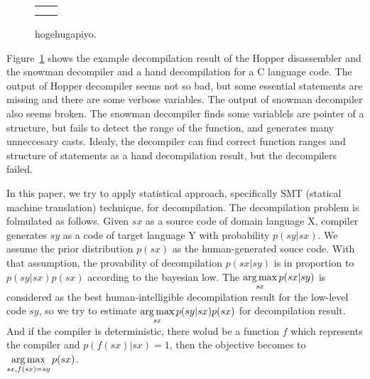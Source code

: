 \documentclass[senior,final,11pt]{iscs-thesis}
\newcommand{\argmax}{\mathop{\rm arg\,max}\limits}
\begin{document}
\begin{figure}
	\begin{tabular}{cc}
		\begin{minipage}[t]{0.5\hsize}
			
		\end{minipage}
		\begin{minipage}[t]{0.5\hsize}
			
		\end{minipage}
		\\
		\begin{minipage}[c]{0.5\hsize}
			
		\end{minipage}
		\begin{minipage}[c]{0.5\hsize}
			
		\end{minipage}
	\end{tabular}
	\caption{ hogehugapiyo.}
	\label{fig:cw}
\end{figure}


Figure~\ref{fig:cw} shows the example decompilation result of the Hopper disassembler and the snowman decompiler and a hand decompilation for a C language code.
The output of Hopper decompiler seems not so bad, but some essential statements are missing and there are some verbose variables.
The output of snowman decompiler also seems broken. 
The snowman decompiler finds some variablels are pointer of a structure, but fails to detect the range of the function, and generates many unneccesary casts.
Idealy, the decompiler can find correct function ranges and structure of statements as a hand decompilation result, but the decompilers failed.

In this paper, we try to apply statistical approach, specifically SMT (statical machine translation) technique, for decompilation.
The decompilation problem is folmulated as follows. 
Given $sx$ as a source code of domain language X, compiler generates $sy$ as a code of target language Y with probability $p(sy|sx)$. 
We assume the prior distribution $p(sx)$ as the human-generated souce code. 
With that assumption, the provability of decompilation $p(sx|sy)$ is in proportion to $p(sy|sx)p(sx)$ according to the bayesian low. 
The $\argmax_{sx} p(sx|sy)$ is considered as the best human-intelligible decompilation result for the low-level code $sy$,  
so we try to estimate $ \argmax_{sx} p(sy|sx)p(sx)$ for decompilation result.
And if the compiler is deterministic, there wolud be a function $f$ which represents the compiler and $p(f(sx)|sx) = 1$,
then the objective becomes to $ \argmax_{sx,f(sx)=sy} p(sx)$.
\end{document}
